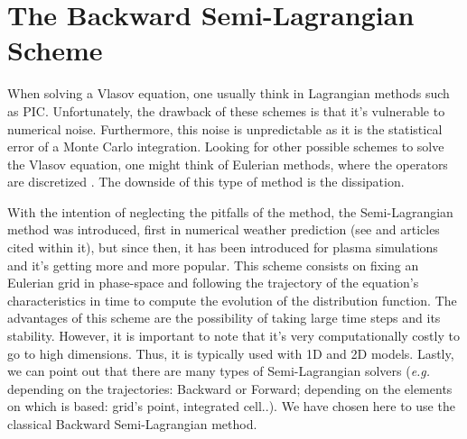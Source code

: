 \documentclass[proc]{edpsmath}
\begin{document}


\section{The Backward Semi-Lagrangian Scheme}
\label{sec:BSL_scheme}

When solving a Vlasov equation, one usually think in Lagrangian methods such as PIC\cite{Birdsall:1985:PPV:577251}. Unfortunately, the drawback of these schemes is that it's vulnerable to numerical noise. Furthermore, this noise is unpredictable as it is the statistical error of a Monte Carlo integration. Looking for other possible schemes to solve the Vlasov equation, one might think of Eulerian methods, where the operators 
are discretized \cite{Zaki1988184}. The downside of this type of method is the dissipation.

With the intention of neglecting the pitfalls of the method, the Semi-Lagrangian method was introduced, first in numerical weather prediction (see \cite{Kalnay03atmosphericmodeling} and articles cited within it), but since then, it has been introduced for plasma simulations \cite{sonnendrucker:inria-00073296, Cheng1976330} and it's getting more and more popular. This scheme consists on fixing an Eulerian grid in phase-space and following the trajectory of the equation's characteristics in time to compute the evolution of the distribution function. The advantages of this scheme are the possibility of taking large time steps and its stability. However, it is important to note that it's very computationally costly to go to high dimensions. Thus, it is typically used with 1D and 2D models. Lastly, we can point out that there are many types of Semi-Lagrangian solvers (\emph{e.g.} depending on the trajectories: Backward or Forward;  depending on the elements on which is based: grid's point, integrated cell..). We have chosen here to use the classical Backward Semi-Lagrangian method. 
\end{document}
